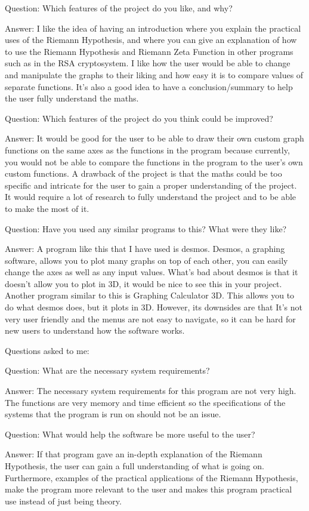 \documentclass{article}
\begin{document}
Question: Which features of the project do you like, and why?

Answer: I like the idea of having an introduction where you explain the practical uses of the Riemann Hypothesis, and where you can give an explanation of how to use the Riemann Hypothesis and Riemann Zeta Function in other programs such as in the RSA cryptosystem. I like how the user would be able to change and manipulate the graphs to their liking and how easy it is to compare values of separate functions. It’s also a good idea to have a  conclusion/summary to help the user fully understand the maths.

Question: Which features of the project do you think could be improved?

Answer: It would be good for the user to be able to draw their own custom graph functions on the same axes as the functions in the program because currently, you would not be able to compare the functions in the program to the user’s own custom functions. A drawback of the project is that the maths could be too specific and intricate for the user to gain a proper understanding of the project. It would require a lot of research to fully understand the project and to be able to make the most of it.

Question: Have you used any similar programs to this? What were they like?

Answer: A program like this that I have used is desmos. Desmos, a graphing software, allows you to plot many graphs on top of each other, you can easily change the axes as well as any input values. What’s bad about desmos is that it doesn’t allow you to plot in 3D, it would be nice to see this in your project. Another program similar to this is Graphing Calculator 3D.
This allows you to do what desmos does, but it plots in 3D. However, its downsides are that It’s not very user friendly and the menus are not easy to navigate, so it can be hard for new users to understand how the software works.

Questions asked to me:

Question: What are the necessary system requirements?

Answer: The necessary system requirements for this program are not very high. The functions are very memory and time efficient so the specifications of the systems that the program is run on should not be an issue.

Question: What would help the software be more useful to the user?

Answer: If that program gave an in-depth explanation of the Riemann Hypothesis, the user can gain a full understanding of what is going on. Furthermore, examples of the practical applications of the Riemann Hypothesis, make the program more relevant to the user and makes this program practical use instead of just being theory.
\end{document}
